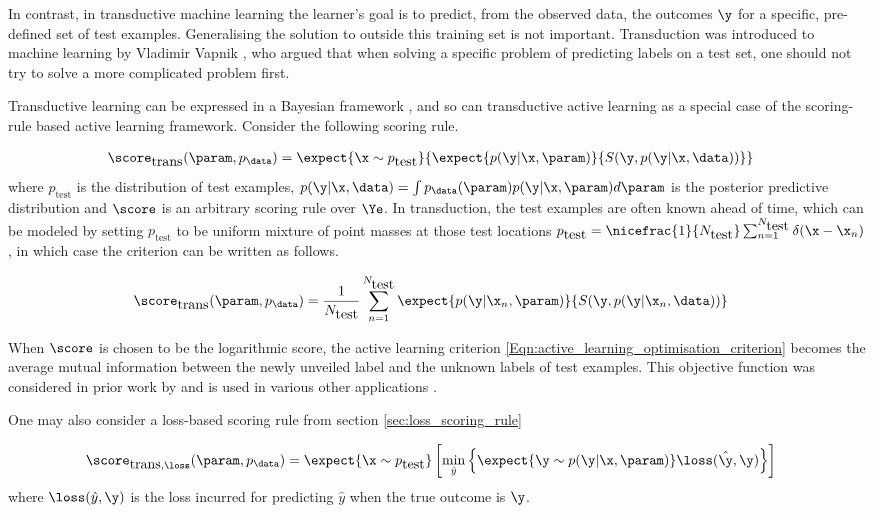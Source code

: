 In contrast, in transductive machine learning the learner's goal is to predict, from the observed data, the outcomes $\y$ for a specific, pre-defined set of test examples. Generalising the solution to outside this training set is not important. Transduction was introduced to machine learning by Vladimir Vapnik \citep[see \eg][]{gammerman1998learning}, who argued that when solving a specific problem of predicting labels on a test set, one should not try to solve a more complicated problem first.

Transductive learning can be expressed in a Bayesian framework \citep{Graepel1999}, and so can transductive active learning as a special case of the scoring-rule based active learning framework. Consider the following scoring rule.

\begin{align}
	\score_{\mbox{trans}}(\param,p_\data) &= \expect{\x\sim p_{\mbox{test}}}{\expect{p(\y\vert\x,\param)}{S(\y,p(\y\vert\x,\data))}}
\end{align}
where $p_{\mbox{test}}$ is the distribution of test examples, $p(\y\vert\x,\data)=\int p_{\data}(\param) p(\y\vert\x,\param) d\param $ is the posterior predictive distribution and $\score$ is an arbitrary scoring rule over $\Ye$. In transduction, the test examples are often known ahead of time, which can be modeled by setting $p_{\mbox{test}}$ to be uniform mixture of point masses at those test locations $p_{\mbox{test}} = \nicefrac{1}{N_{\mbox{test}}}\sum_{n=1}^{N_{\mbox{test}}} \delta(\x - \x_n)$, in which case the criterion can be written as follows.

\begin{align}
	\score_{\mbox{trans}}(\param,p_\data) &= \frac{1}{N_{\mbox{test}}}\sum_{n=1}^{N_{\mbox{test}}} \expect{p(\y\vert\x_n,\param)}{S(\y,p(\y\vert\x_n,\data))}
\end{align}

When $\score$ is chosen to be the logarithmic score, the active learning criterion \eqref{Eqn:active_learning_optimisation_criterion} becomes the average mutual information between the newly unveiled label and the unknown labels of test examples. This objective function was considered in prior work by \citet{MacKay1992} and is used in various other applications \citep[see \eg][]{Ertin2003,Fuhrmann2003}.

One may also consider a loss-based scoring rule from section \ref{sec:loss_scoring_rule}

\begin{align}
	\score_{\mbox{trans},\loss}(\param,p_\data) &= \expect{\x\sim p_{\mbox{test}}}\left[ \min_{\hat{y}} \left\{\expect{\y\sim p(\y\vert\x,\param)} \loss(\hat{\y},\y) \right\} \right]\label{Eqn:transductive_loss_scoring}
\end{align}
where $\loss(\hat{y},\y)$ is the loss incurred for predicting $\hat{y}$ when the true outcome is $\y$.

